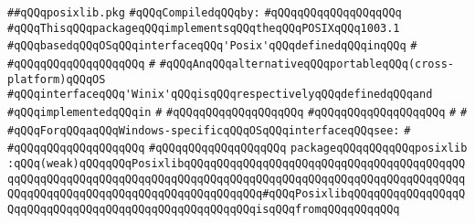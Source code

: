 \label{src/lib/std/src/psx/posixlib.pkg}
\verb|##qQQqposixlib.pkg|\newline
\newline
\verb|#qQQqCompiledqQQqby:|\newline
\verb|#qQQqqQQqqQQqqQQqqQQq|\newline
\newline
\verb|#qQQqThisqQQqpackageqQQqimplementsqQQqtheqQQqPOSIXqQQq1003.1|\newline
\verb|#qQQqbasedqQQqOSqQQqinterfaceqQQq'Posix'qQQqdefinedqQQqinqQQq|\newline
\verb|#|\newline
\verb|#qQQqqQQqqQQqqQQqqQQq|\newline
\verb|#|\newline
\verb|#qQQqAnqQQqalternativeqQQqportableqQQq(cross-platform)qQQqOS|\newline
\verb|#qQQqinterfaceqQQq'Winix'qQQqisqQQqrespectivelyqQQqdefinedqQQqand|\newline
\verb|#qQQqimplementedqQQqin|\newline
\verb|#|\newline
\verb|#qQQqqQQqqQQqqQQqqQQq|\newline
\verb|#qQQqqQQqqQQqqQQqqQQq|\newline
\verb|#|\newline
\verb|#|\newline
\verb|#qQQqForqQQqaqQQqWindows-specificqQQqOSqQQqinterfaceqQQqsee:|\newline
\verb|#|\newline
\verb|#qQQqqQQqqQQqqQQqqQQq|\newline
\verb|#qQQqqQQqqQQqqQQqqQQq|\newline
\newline
\newline
\newline
\verb|packageqQQqqQQqqQQqposixlib|\newline
\verb|:qQQq(weak)qQQqqQQqPosixlibqQQqqQQqqQQqqQQqqQQqqQQqqQQqqQQqqQQqqQQqqQQqqQQqqQQqqQQqqQQqqQQqqQQqqQQqqQQqqQQqqQQqqQQqqQQqqQQqqQQqqQQqqQQqqQQqqQQqqQQqqQQqqQQqqQQqqQQqqQQqqQQqqQQqqQQq#qQQqPosixlibqQQqqQQqqQQqqQQqqQQqqQQqqQQqqQQqqQQqqQQqqQQqqQQqqQQqqQQqisqQQqfromqQQqqQQqqQQq|\newline
